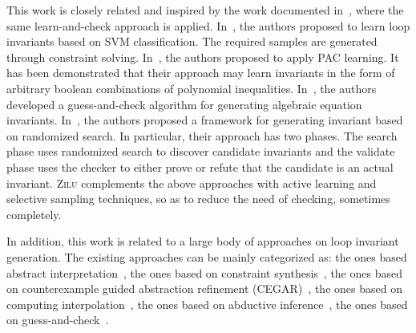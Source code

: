 This work is closely related and inspired by the work documented in~\cite{sharma2012interpolants,sharma2013verification,DBLP:conf/esop/0001GHALN13,sharma2014invariant}, where the same learn-and-check approach is applied. 
In~\cite{sharma2012interpolants}, the authors proposed to learn loop invariants based on SVM classification. The required samples are generated through constraint solving. In~\cite{sharma2013verification}, the authors proposed to apply PAC learning. It has been demonstrated that their approach may learn invariants in the form of arbitrary boolean
combinations of polynomial inequalities. In~\cite{DBLP:conf/esop/0001GHALN13}, the authors developed a guess-and-check algorithm for generating algebraic equation invariants. In~\cite{sharma2014invariant}, the authors proposed a framework for generating invariant based on randomized search. In particular, their approach has two phases. The search phase uses randomized search to discover candidate invariants and the validate phase uses the checker to either prove or refute that the candidate is an actual invariant. \textsc{Zilu} complements the above approaches with active learning and selective sampling techniques, so as to reduce the need of checking, sometimes completely.

In addition, this work is related to a large body of approaches on loop invariant generation. The existing approaches can be mainly categorized as:
the ones based abstract interpretation~\cite{cousot1978automatic,mine2006octagon,cousot1979systematic,karr1976affine,vincent2009subpolyhedra}, 
the ones based on constraint synthesis~\cite{ashutosh2009invgen,michael2003linear,sumit2009constraint}, 
the ones based on counterexample guided abstraction refinement (CEGAR)~\cite{henzinger2003software,thomas2001slam,edmund2003counterexample}, 
the ones based on computing interpolation~\cite{kenneth2010lazy,thomas2004abstractions,kenneth2003interpolation,Kenneth2006lazy}, 
the ones based on abductive inference~\cite{isil2013inductive}, 
the ones based on guess-and-check~\cite{cormac2001houdini,ernst2007daikon}.

